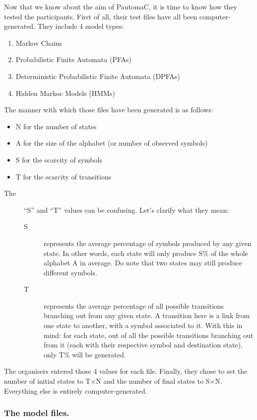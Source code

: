 \quad{}\enskip{}Now that we know about the aim of PautomaC, it is
time to know how they tested the participants. First of all, their
test files have all been computer-generated. They include 4 model
types:
\begin{enumerate}
\item Markov Chains
\item Probabilistic Finite Automata (PFAs)
\item Deterministic Probabilistic Finite Automata (DPFAs)
\item Hidden Markoc Models (HMMs)
\end{enumerate}
The manner with which those files have been generated is as follows:
\begin{itemize}
\item N for the number of states
\item A for the size of the alphabet (or number of observed symbols)
\item S for the scarcity of symbols
\item T for the scarcity of transitions\end{itemize}
\begin{description}
\item [{\textmd{The}}] ``S'' and ``T'' values can be confusing. Let's
clarify what they mean:

\begin{description}
\item [{S}] represents the average percentage of symbols produced by any
given state. In other words, each state will only produce S\% of the
whole alphabet A in average. Do note that two states may still produce
different symbols.
\item [{T}] represents the average percentage of all possible transitions
branching out from any given state. A transition here is a link from
one state to another, with a symbol associated to it. With this in
mind: for each state, out of all the possible transitions branching
out from it (each with their respective symbol and destination state),
only T\% will be generated.
\end{description}
\end{description}
\enskip{}\enskip{}\enskip{}The organisers entered those 4 values
for each file. Finally, they chose to set the number of initial states
to T$\times$N and the number of final states to S$\times$N. Everything
else is entirely computer-generated. 


\subsubsection{The model files.}


